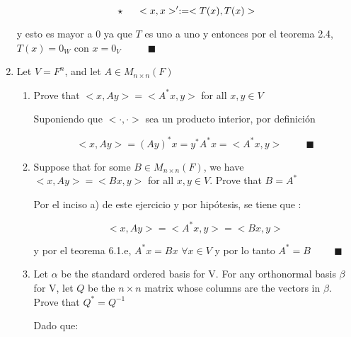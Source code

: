 \documentclass[12pt,a4paper]{article}
\begin{document}
\begin{enumerate}
    \begin{equation*}
        \star \hspace{0.5cm}<x,x>' := <T(x), T(x)> 
    \end{equation*}
    
    y esto es mayor a $0$ ya que $T$ es uno a uno y entonces por el teorema 2.4, $T(x) = 0_W $ con $x = 0_V$ $ \hspace{1cm}\blacksquare$
     
    
    
    
    
    
    
    \item Let $V=F^n$, and let $A \in M_{n\times n}(F)$
    \begin{enumerate}
        \item Prove that $<x,Ay> = <A^* x,y>$ for all $x,y \in V$
        
        Suponiendo que $<\cdot,\cdot>$  sea un producto interior, por definición 
        
        \begin{equation*}
            <x,Ay> = (Ay)^* x = y^* A^* x = <A^* x , y> \hspace{1cm} \blacksquare
        \end{equation*}
        
        
        \item Suppose that for some $B \in M_{n \times n}(F)$, we have $<x,Ay>=<Bx,y>$ for all $x,y \in V$. Prove that $B = A^*$
        
        Por el inciso a) de este ejercicio y por hipótesis, se tiene que :
        
        \begin{equation*}
            <x,Ay> = <A^* x,y> = <Bx,y>
        \end{equation*}
        
        y por el teorema 6.1.e, $A^*x = Bx$ $\forall x \in V$ y por lo tanto $A^* = B \hspace{1cm} \blacksquare$
        
        \item Let $\alpha$ be the standard ordered basis for V. For any orthonormal basis $\beta$ for V, let $Q$ be the $n \times n$ matrix whose columns are the vectors in $\beta$. Prove that $Q^* = Q^{-1}$
        
        Dado que:
        

\end{enumerate}
\end{enumerate}
\end{document}
